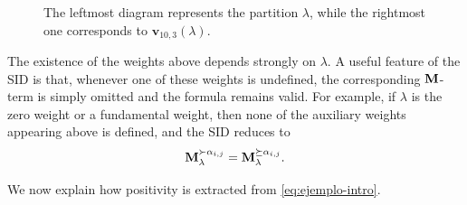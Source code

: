 \begin{figure}

    \caption{The leftmost diagram represents the partition $\lambda$, while the rightmost one corresponds to $\mathbf{v}_{10,3}(\lambda) $.}
    \label{fig:introC}
\end{figure}

The existence of the weights above depends strongly on $\lambda$. A useful feature of the SID is that, whenever one of these weights is undefined, the corresponding $\mathbf{M}$-term is simply omitted and the formula remains valid. For example, if $\lambda$ is the zero weight or a fundamental weight, then none of the auxiliary weights appearing above is defined, and the SID reduces to
\[
    \mathbf{M}_{\lambda}^{\succ\alpha_{i,j}}=\mathbf{M}_{\lambda}^{\succeq\alpha_{i,j}}.
\]

We now explain how positivity is extracted from \eqref{eq:ejemplo-intro}.

